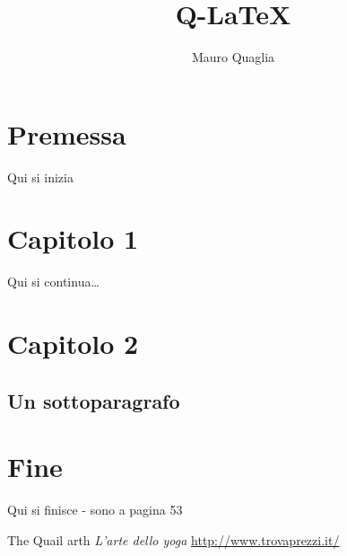 \documentclass[a4paper,11pt,twoside]{article}
\begin{document}
	\author{Mauro Quaglia}
	\title{Q-\LaTeX}
	\maketitle %
	
	\begin{abstract}
		\lipsum[1]
	\end{abstract}
	
	\tableofcontents
	
	\section{Premessa}
	Qui si inizia
	
	\section{Capitolo 1}
	Qui si continua\dots
	
	\section{Capitolo 2}
	\label{sec:esempio}
	
	\subsection{Un sottoparagrafo}
	
	\section{Fine}
	Qui si finisce - sono a pagina 53
	
	\begin{thebibliography}{9}
		 The Quail arth
		\emph{L'arte dello yoga}
		\url{http://www.trovaprezzi.it/}
	\end{thebibliography}
\end{document}
